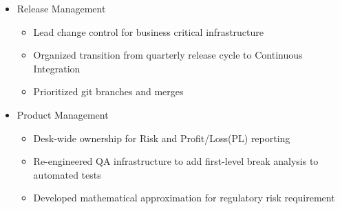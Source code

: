 \documentclass[11pt,letterpaper,roman]{moderncv}
\begin{document}
\begin{itemize}
    \item Release Management
        \begin{itemize}
            \item Lead change control for business critical infrastructure
            \item Organized transition from quarterly release cycle to Continuous Integration
            \item Prioritized git branches and merges
        \end{itemize}

    \item{Product Management}
        \begin{itemize}
            \item Desk-wide ownership for Risk and Profit/Loss(PL) reporting
            \item Re-engineered QA infrastructure to add first-level break analysis to automated tests
            \item Developed mathematical approximation for regulatory risk requirement
        \end{itemize}


\end{itemize}
\end{document}
